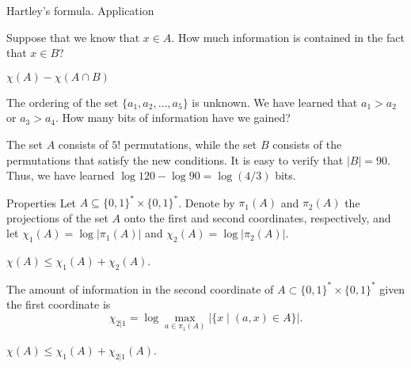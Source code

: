 \documentclass[aspectratio=169]{beamer}
\newcommand{\bits}{\{0,1\}}
\newcommand{\bitstr}{\bits^*}
\newcommand{\seqn}[2]{{#1}_1,{#1}_2,\dotsc,{#1}_{#2}}
\begin{document}
\begin{frame}{Hartley's formula. Application}
\begin{example}
Suppose that we know that $x\in A$. How much information is contained in the fact that $x\in B$?
\end{example}
\pause
\begin{solution}
\(\chi(A) - \chi(A\cap B)\)
\end{solution}
\pause
\begin{example}
    The ordering of the set $\{\seqn{a}{5}\}$ is unknown. We have learned that \(a_1>a_2\) or \(a_3>a_4\). How many bits of information have we gained?
\end{example}
\pause
\begin{solution}
    The set \(A\) consists of \(5!\) permutations, while the set \(B\) consists of the permutations that satisfy the new conditions. It is easy to verify that \(|B| = 90\).
    \\Thus, we have learned \(\log 120 - \log 90 = \log(4/3)\) bits.
\end{solution}
\end{frame}

\begin{frame}{Properties}
Let \(A\subseteq\bitstr\times\bitstr\). Denote by \(\pi_1(A)\) and \(\pi_2(A)\) the projections of the set \(A\) onto the first and second coordinates, respectively, and let \(\chi_1(A) = \log|\pi_1(A)|\) and \(\chi_2(A) = \log|\pi_2(A)|\).

\begin{theorem}
    \(\chi(A) \le \chi_1(A) + \chi_2(A)\).
\end{theorem}

\begin{definition}
    The amount of information in the second coordinate of \(A\subset\bitstr\times\bitstr\) given the first coordinate is
    \[\chi_{2|1} = \log\max_{a\in\pi_1(A)}\bigl|\{x \mid (a, x)\in A\}\bigr|.\]
\end{definition}\vspace{-5mm}
\begin{theorem}
    \(\chi(A) \le \chi_1(A) + \chi_{2|1}(A)\).
\end{theorem}
\end{frame}
\end{document}
